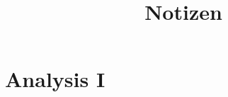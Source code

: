 \documentclass[openany]{book}
\title{Notizen}
\author{}
\date{}
\begin{document}
\newtheorem{theorem}{Satz}[section]
\newtheorem{axiom}{Axiom}[section]
\newtheorem{lemma}{Lemma}[section]
\theoremstyle{definition}
\newtheorem{example}{Beispiel}[section]
\newtheorem{definition}{Definition}[section]
\theoremstyle{remark}
\newtheorem*{remark}{Bemerkung}

\maketitle
\tableofcontents

\part{Analysis I}

\end{document}
